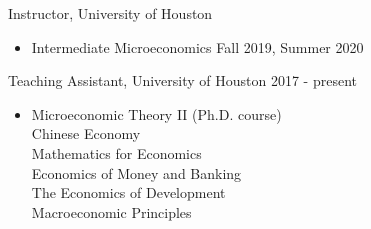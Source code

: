 \documentclass[10pt]{article}
\renewcommand{\section}[1]{\pagebreak[3]%
    \hyphenpenalty=10000%
    \vspace{1.3\baselineskip}%
    \phantomsection\addcontentsline{toc}{section}{#1}%
    \noindent\llap{\scshape\smash{\parbox[t]{\marginparwidth}{\raggedright #1}}}%
    \vspace{-\baselineskip}\par}
\newenvironment{innerlist}[1][\enskip\textbullet]%
        {\begin{itemize}[#1,leftmargin=*,parsep=0pt,itemsep=0pt,topsep=0pt,partopsep=0pt]}
        {\end{itemize}}
\newcommand{\blankline}{\quad\pagebreak[3]}
\newcommand{\halfblankline}{\quad\vspace{-0.5\baselineskip}\pagebreak[3]}
\begin{document}
Instructor, University of Houston 
\begin{innerlist}
	\item[] Intermediate Microeconomics  \hfill {Fall 2019, Summer 2020}\\
\end{innerlist}

Teaching Assistant, University of Houston \hfill {2017 - present}
\begin{innerlist}

\item[] Microeconomic Theory II (Ph.D. course)\\
		Chinese Economy\\
		 Mathematics for Economics \\
		Economics of Money and Banking \\
		The Economics of Development\\
		Macroeconomic Principles \\

\end{innerlist}


\halfblankline

\end{document}

